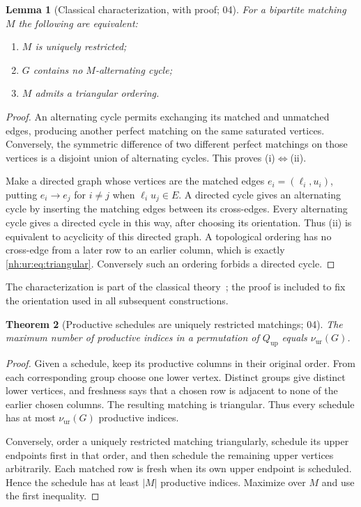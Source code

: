 \documentclass[11pt,a4paper]{article}
\newtheorem{theorem}{Theorem}[section]
\newtheorem{lemma}[theorem]{Lemma}
\theoremstyle{definition}
\theoremstyle{remark}
\newcommand{\Qup}{Q_{\mathrm{up}}}
\newcommand{\nuur}{\nu_{\mathrm{ur}}}
\begin{document}
\begin{lemma}[Classical characterization, with proof; 04]\label{nh:ur:lem:ur}
For a bipartite matching $M$ the following are equivalent:
\begin{enumerate}[label=(\roman*),nosep]
\item $M$ is uniquely restricted;
\item $G$ contains no $M$-alternating cycle;
\item $M$ admits a triangular ordering.
\end{enumerate}
\end{lemma}
\begin{proof}
An alternating cycle permits exchanging its matched and unmatched edges,
producing another perfect matching on the same saturated vertices. Conversely,
the symmetric difference of two different perfect matchings on those vertices
is a disjoint union of alternating cycles. This proves (i)$\Leftrightarrow$(ii).

Make a directed graph whose vertices are the matched edges
$e_i=(\ell_i,u_i)$, putting $e_i\to e_j$ for $i\ne j$ when
$\ell_i u_j\in E$. A directed cycle gives an alternating cycle by inserting
the matching edges between its cross-edges. Every alternating cycle gives a
directed cycle in this way, after choosing its orientation. Thus (ii) is
equivalent to acyclicity of this directed graph. A topological ordering has no
cross-edge from a later row to an earlier column, which is exactly
\eqref{nh:ur:eq:triangular}. Conversely such an ordering forbids a directed
cycle.
\end{proof}
The characterization is part of the classical theory~\cite{GHL2001}; the
proof is included to fix the orientation used in all subsequent
constructions.

\begin{theorem}[Productive schedules are uniquely restricted matchings; 04]
\label{nh:ur:thm:productive}
The maximum number of productive indices in a permutation of $\Qup$ equals
$\nuur(G)$.
\end{theorem}
\begin{proof}
Given a schedule, keep its productive columns in their original order. From each
corresponding group choose one lower vertex. Distinct groups give distinct lower
vertices, and freshness says that a chosen row is adjacent to none of the
earlier chosen columns. The resulting matching is triangular. Thus every
schedule has at most $\nuur(G)$ productive indices.

Conversely, order a uniquely restricted matching triangularly, schedule its
upper endpoints first in that order, and then schedule the remaining upper
vertices arbitrarily. Each matched row is fresh when its own upper endpoint is
scheduled. Hence the schedule has at least $|M|$ productive indices. Maximize
over $M$ and use the first inequality.
\end{proof}
\end{document}
